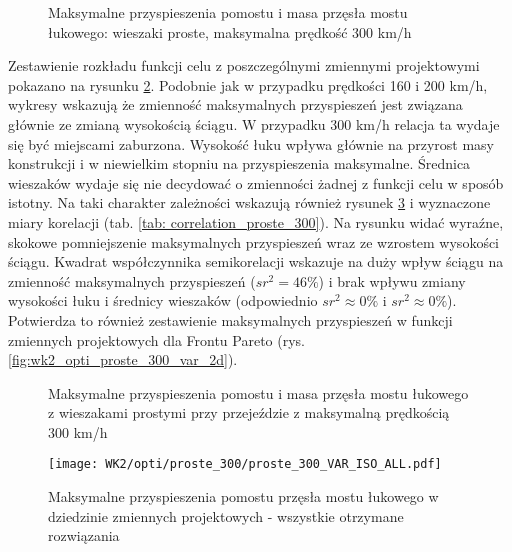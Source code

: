 \begin{figure}[hbt!]
	\centering
	\captionsetup{justification=centering}
	\caption{Maksymalne przyspieszenia pomostu i masa przęsła mostu łukowego: wieszaki proste, maksymalna prędkość 300 km/h}
	\label{fig:wk2_opti_proste_300_all}
\end{figure}

Zestawienie rozkładu funkcji celu z poszczególnymi zmiennymi projektowymi pokazano na rysunku \ref{fig:wk2_opti_proste_300_variables}. Podobnie jak w przypadku prędkości 160 i 200 km/h, wykresy wskazują że zmienność maksymalnych przyspieszeń jest związana głównie ze zmianą wysokością ściągu. W przypadku 300 km/h relacja ta wydaje się być miejscami zaburzona. Wysokość łuku wpływa głównie na przyrost masy konstrukcji i w niewielkim stopniu na przyspieszenia maksymalne. Średnica wieszaków wydaje się nie decydować o zmienności żadnej z funkcji celu w sposób istotny. Na taki charakter zależności wskazują również rysunek \ref{fig:wk2_opti_proste_300_vars_all} i wyznaczone miary korelacji (tab. \ref{tab: correlation_proste_300}). Na rysunku widać wyraźne, skokowe pomniejszenie maksymalnych przyspieszeń wraz ze wzrostem wysokości ściągu. Kwadrat współczynnika semikorelacji wskazuje na duży wpływ ściągu na zmienność maksymalnych przyspieszeń ($sr^2=46\%$) i brak wpływu zmiany wysokości łuku i średnicy wieszaków (odpowiednio $sr^2\approx 0\%$ i $sr^2\approx 0\%$). Potwierdza to również zestawienie maksymalnych przyspieszeń w funkcji zmiennych projektowych dla Frontu Pareto (rys. \ref{fig:wk2_opti_proste_300_var_2d}). 

\begin{figure}[hbt!]
	\centering
	\captionsetup{justification=centering}
	\caption{Maksymalne przyspieszenia pomostu i masa przęsła mostu łukowego z wieszakami prostymi przy przejeździe z maksymalną prędkością 300 km/h}
	\label{fig:wk2_opti_proste_300_variables}
\end{figure}
\begin{figure}[hbt!]
	\centering
	\texttt{[image: WK2/opti/proste\_300/proste\_300\_VAR\_ISO\_ALL.pdf]}
	\captionsetup{justification=centering}
	\caption{Maksymalne przyspieszenia pomostu przęsła mostu łukowego w dziedzinie zmiennych projektowych - wszystkie otrzymane rozwiązania}
	\label{fig:wk2_opti_proste_300_vars_all}
\end{figure}


